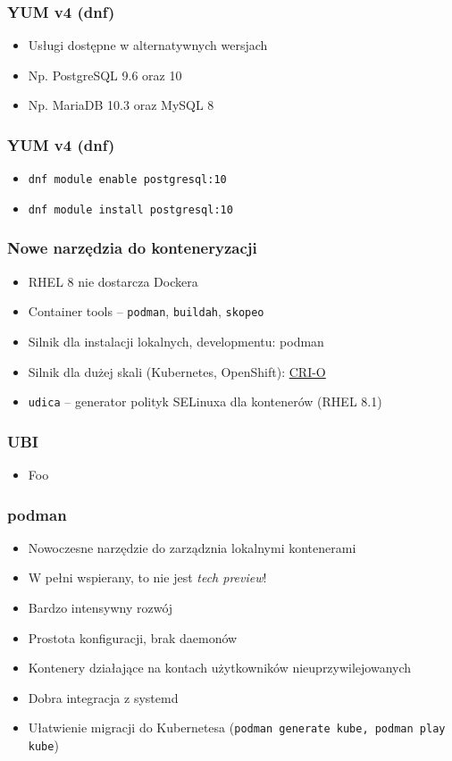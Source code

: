 \documentclass[dvipsnames,table]{beamer}
\begin{document}
\begin{frame}
\frametitle{YUM v4 (dnf)}
\begin{itemize}
	\item Usługi dostępne w alternatywnych wersjach
	\item Np. PostgreSQL 9.6 oraz 10
	\item Np. MariaDB 10.3 oraz MySQL 8
\end{itemize}
\end{frame}

\begin{frame}
\frametitle{YUM v4 (dnf)}
\begin{itemize}
	\item {\tt dnf module enable postgresql:10}
	\item {\tt dnf module install postgresql:10}
\end{itemize}
%
\end{frame}

\begin{frame}
	\frametitle{Nowe narzędzia do konteneryzacji}
\begin{itemize}
	\item RHEL 8 nie dostarcza Dockera
	\item Container tools -- {\tt podman}, {\tt buildah}, {\tt skopeo}
	\item Silnik dla instalacji lokalnych, developmentu: podman
	\item Silnik dla dużej skali (Kubernetes, OpenShift): \href{https://cri-o.io/}{CRI-O}
	\item {\tt udica} -- generator polityk SELinuxa dla kontenerów (RHEL 8.1)
\end{itemize}
\end{frame}

\begin{frame}
	\frametitle{UBI}
	\begin{itemize}
		\item Foo
	\end{itemize}
\end{frame}

\begin{frame}
	\frametitle{podman}
	\begin{itemize}
		\item Nowoczesne narzędzie do zarządznia lokalnymi kontenerami
		\item W pełni wspierany, to nie jest {\em tech preview}!
		\item Bardzo intensywny rozwój
		\item Prostota konfiguracji, brak daemonów
		\item Kontenery działające na kontach użytkowników nieuprzywilejowanych
		\item Dobra integracja z systemd
		\item Ułatwienie migracji do Kubernetesa ({\tt podman generate kube, podman play kube})
	\end{itemize}
\end{frame}
\end{document}
